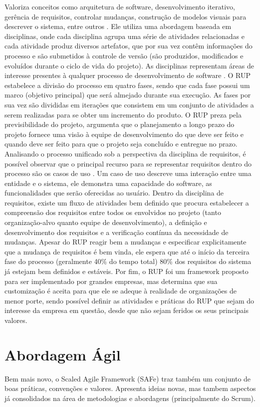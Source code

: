 Valoriza conceitos como arquitetura de software, desenvolvimento iterativo, gerência de requisitos, controlar mudanças, construção de modelos visuais para descrever o sistema, entre outros \cite{kruchten001}. Ele utiliza uma abordagem baseada em disciplinas, onde cada disciplina agrupa uma série de atividades relacionadas e cada atividade produz diversos artefatos, que por sua vez contêm informações do processo e são submetidos à controle de versão (são produzidos, modificados e evoluídos durante o ciclo de vida do projeto). As disciplinas representam áreas de interesse presentes à qualquer processo de desenvolvimento de software \cite{kruchten001}. O RUP estabelece a divisão do processo em quatro fases, sendo que cada fase possui um marco (objetivo principal) que será almejado durante sua execução. As fases por sua vez são divididas em iterações que consistem em um conjunto de atividades a serem realizadas para se obter um incremento do produto. O RUP preza pela previsibilidade do projeto, argumenta que o planejamento a longo prazo do projeto fornece uma visão à equipe de desenvolvimento do que deve ser feito e quando deve ser feito para que o projeto seja concluído e entregue no prazo. Analisando o processo unificado sob a perspectiva da disciplina de requisitos, é possível observar que o principal recurso para se representar requisitos dentro do processo são os casos de uso \cite{kruchten001}. Um caso de uso descreve uma interação entre uma entidade e o sistema, ele demonstra uma capacidade do software, as funcionalidades que serão oferecidas ao usuário. Dentro da disciplina de requisitos, existe um fluxo de atividades bem definido que procura estabelecer a compreensão dos requisitos entre todos os envolvidos no projeto (tanto organização-alvo quanto equipe de desenvolvimento), a definição e desenvolvimento dos requisitos e a verificação contínua da necessidade de mudanças. Apesar do RUP reagir bem a mudanças e especificar explicitamente que a mudança de requisitos é bem vinda, ele espera que até o início da terceira fase do processo (geralmente 40\% do tempo total) 80\% dos requisitos do sistema já estejam bem definidos e estáveis.
Por fim, o RUP foi um framework proposto para ser implementado por grandes empresas, mas determina que sua customização é aceita para que ele se adeque à realidade de organizações  de menor porte, sendo possível definir as atividades e práticas do RUP que sejam do interesse da empresa em questão, desde que não sejam feridos os seus principais valores.

\section{Abordagem Ágil}
Bem mais novo, o Scaled Agile Framework (SAFe) traz também um conjunto de boas práticas, convenções e valores. Apresenta ideias novas, mas tambem aspectos já consolidados na área de metodologias e abordagens (principalmente do Scrum).

